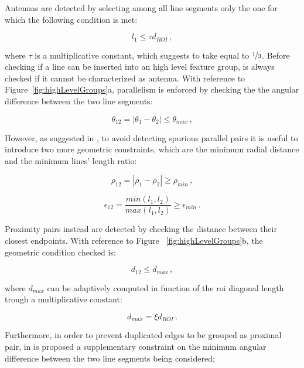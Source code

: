Antennas are detected by selecting among all line segments only the one for which the following condition is met:

\begin{equation}
  l_1  \leqslant \tau d_{ROI} \,,
\end{equation}

where $\tau$ is a multiplicative constant, which \cite{Sharma2018} suggests to take equal to $\nicefrac{1}{3}$. Before checking if a line can be inserted into an high level feature group, is always checked if it cannot be characterized as antenna.
With reference to Figure~\ref{fig:highLevelGroups}a, parallelism is enforced by checking the the angular difference between the two line segments:

\begin{equation}
  \theta_{12} = |\theta_1 - \theta_2| \leqslant \theta_{max} \,,
\end{equation}

However, as suggested in \cite{fracchio2019}, to avoid detecting spurious parallel pairs it is useful to introduce two more geometric constraints, which are the minimum radial distance and the minimum lines' length ratio:

\begin{equation}
  \rho_{12} = |\rho_1 - \rho_2| \geq  \rho_{min} \,,
\end{equation}

\begin{equation}
  \epsilon_{12} = \frac{min(l_1,l_2)}{max(l_1,l_2)} \geq \epsilon_{min} \,.
\end{equation}

Proximity pairs instead are detected by checking the distance between their closest endpoints. With reference to Figure ~\ref{fig:highLevelGroups}b, the geometric condition checked is:

\begin{equation}
  d_{12} \leqslant d_{max} \,,
\end{equation}

where $d_{max}$ can be adaptively computed in function of the \acrshort{roi} diagonal length trough a multiplicative constant:

\begin{equation}
  d_{max} = \xi d_{ROI} \,.
\end{equation}

Furthermore, in order to prevent duplicated edges to be grouped as proximal pair, in \cite{fracchio2019} is proposed a supplementary constraint on the minimum angular difference between the two line segments being considered:

